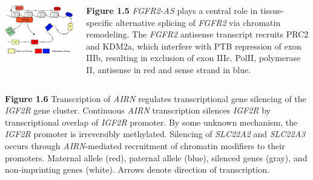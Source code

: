 \documentclass{beamer}
\begin{document}
\begin{frame}
  \begin{columns}
    \includegraphics[scale=0.50]{figures/FGFR2-AS2.pdf}

    \begin{block}{\textbf{Figure 1.5}}
      \emph{FGFR2-AS} plays a central role in tissue-specific alternative splicing of \emph{FGFR2} via chromatin remodeling. The \emph{FGFR2} antisense transcript recruits PRC2 and KDM2a, which interfere with PTB repression of exon IIIb, resulting in exclusion of exon IIIc. PolII, polymerase II, antisense in red and sense strand in blue.
    \end{block}
  \end{columns}
  
\end{frame}

\begin{frame}

    \textbf{Figure 1.6}
      Transcription of \emph{AIRN} regulates transcriptional gene silencing of the \emph{IGF2R} gene cluster. Continuous \emph{AIRN} transcription silences \emph{IGF2R} by transcriptional overlap of \emph{IGF2R} promoter. By some unknown mechanism, the \emph{IGF2R} promoter is irreversibly methylated. Silencing of \emph{SLC22A2} and \emph{SLC22A3} occurs through \emph{AIRN}-mediated recruitment of chromatin modifiers to their promoters. Maternal allele (red), paternal allele (blue), silenced genes (gray), and non-imprinting genes (white). Arrows denote direction of transcription.

\end{frame}
\end{document}
